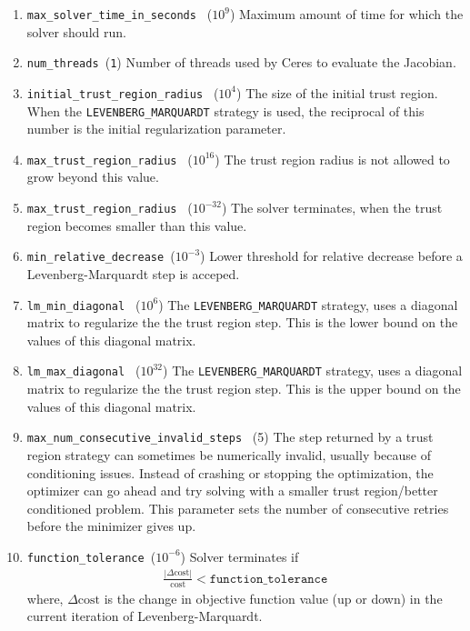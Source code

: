 \begin{enumerate}
\item{\texttt{max\_solver\_time\_in\_seconds }} ($10^9$) Maximum amount of time for which the solver should run.

\item{\texttt{num\_threads }}(\texttt{1})
Number of threads used by Ceres to evaluate the Jacobian.

\item{\texttt{initial\_trust\_region\_radius } ($10^4$)} The size of the initial trust region. When the \texttt{LEVENBERG\_MARQUARDT} strategy is used, the reciprocal of this number is the initial regularization parameter.

\item{\texttt{max\_trust\_region\_radius } ($10^{16}$)} The trust region radius is not allowed to grow beyond this value.
\item{\texttt{max\_trust\_region\_radius } ($10^{-32}$)} The solver terminates, when the trust region becomes smaller than this value.

\item{\texttt{min\_relative\_decrease }}($10^{-3}$) Lower threshold for relative decrease before a Levenberg-Marquardt step is acceped.

\item{\texttt{lm\_min\_diagonal } ($10^6$)} The \texttt{LEVENBERG\_MARQUARDT} strategy, uses a diagonal matrix to regularize the the trust region step. This is the lower bound on the values of this diagonal matrix.

\item{\texttt{lm\_max\_diagonal } ($10^{32}$)}  The \texttt{LEVENBERG\_MARQUARDT} strategy, uses a diagonal matrix to regularize the the trust region step. This is the upper bound on the values of this diagonal matrix.

\item{\texttt{max\_num\_consecutive\_invalid\_steps } (5)} The step returned by a trust region strategy can sometimes be numerically invalid, usually because of conditioning issues. Instead of crashing or stopping the optimization, the optimizer can go ahead and try solving with a smaller trust region/better conditioned problem. This parameter sets the number of consecutive retries before the minimizer gives up.

\item{\texttt{function\_tolerance }}($10^{-6}$) Solver terminates if
\begin{align}
\frac{|\Delta \text{cost}|}{\text{cost}} < \texttt{function\_tolerance}
\end{align}
where, $\Delta \text{cost}$ is the change in objective function value (up or down) in the current iteration of Levenberg-Marquardt.


\end{enumerate}
